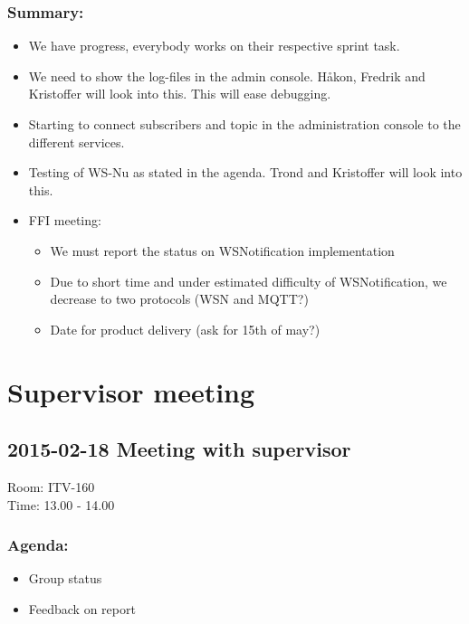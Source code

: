 \subsubsection*{Summary:}
\begin{itemize}
\setlength{\itemsep}{0cm}%
\item We have progress, everybody works on their respective sprint task. 
\item We need to show the log-files in the admin console. Håkon, Fredrik and Kristoffer will look into this. This will ease debugging. 
\item Starting to connect subscribers and topic in the administration console to the different services. 
\item Testing of WS-Nu as stated in the agenda. Trond and Kristoffer will look into this.
\item FFI meeting: \begin{itemize}
\setlength{\itemsep}{0cm}%
\item We must report the status on WSNotification implementation
\item Due to short time and under estimated difficulty of WSNotification, we decrease to two protocols (WSN and MQTT?)
\item Date for product delivery (ask for 15th of  may?)	
\end{itemize}
\end{itemize}

\section{Supervisor meeting}

\subsection*{2015-02-18 Meeting with supervisor}
Room: ITV-160 \\
\noindent Time: 13.00 - 14.00

\subsubsection*{Agenda:}
\begin{itemize}
\setlength{\itemsep}{0cm}%
\item Group status
\item Feedback on report
\end{itemize}

